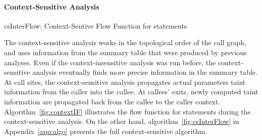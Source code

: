 \paragraph{Context-Sensitive Analysis}
\begin{algorithm}
\caption{csInterFlow: Context-Sentive Flow Function for \callt
statements}\label{fig:contextIF}
\SetAlgoLined
\LinesNumbered
\DontPrintSemicolon
{}

\OutData{}
\end{algorithm}

The context-sensitive analysis works in the topological order
of the call graph, and uses information from the summary table
that were produced by previous analyses. Even if the context-insensitive
analysis was run before, the context-sensitive analysis eventually
finds more precise information in the summary table. At call sites,
the context-sensitive analysis propagates actual parameters
taint information from the caller into the callee. At callees' exits,
newly computed taint information are propagated back from the
callee to the caller context. Algorithm~\ref{fig:contextIF}
illustrates the flow function for \callt statements during the
context-sensitive analysis. On the other hand, algorithm~\ref{fig:csInterFlow}
in Appendix~\ref{app:algo} presents the full context-sensitive
algorithm.

